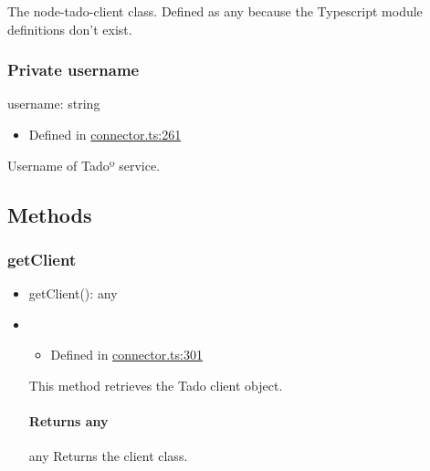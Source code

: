 \documentclass[]{article}
\providecommand{\tightlist}{%
  \setlength{\itemsep}{0pt}\setlength{\parskip}{0pt}}
\let\oldparagraph\paragraph
\renewcommand{\paragraph}[1]{\oldparagraph{#1}\mbox{}}
\begin{document}
The node-tado-client class. Defined as any because the Typescript module
definitions don't exist.

\protect\hypertarget{username}{}{}

\hypertarget{private-username}{%
\subsubsection{\texorpdfstring{{Private}
username}{Private username}}\label{private-username}}

username{:} {string}

\begin{itemize}
\tightlist
\item
  Defined in
  \href{https://github.com/BFMBFramework/TadoConnector/blob/f05932b/src/connector.ts\#L261}{connector.ts:261}
\end{itemize}

Username of Tadoº service.

\hypertarget{methods-1}{%
\subsection{Methods}\label{methods-1}}

\protect\hypertarget{getclient}{}{}

\hypertarget{getclient}{%
\subsubsection{getClient}\label{getclient}}

\begin{itemize}
\tightlist
\item
  getClient{(}{)}{: }{any}
\end{itemize}

\begin{itemize}
\item
  \begin{itemize}
  \tightlist
  \item
    Defined in
    \href{https://github.com/BFMBFramework/TadoConnector/blob/f05932b/src/connector.ts\#L301}{connector.ts:301}
  \end{itemize}

  This method retrieves the Tado client object.

  \hypertarget{returns-any}{%
  \paragraph{\texorpdfstring{Returns
  {any}}{Returns any}}\label{returns-any}}

  any Returns the client class.
\end{itemize}
\end{document}
